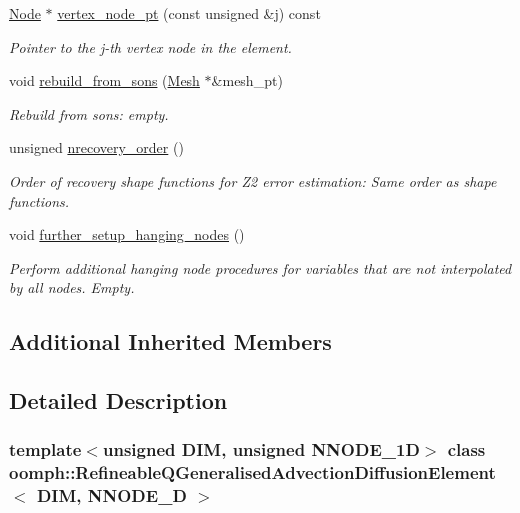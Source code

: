 \begin{DoxyCompactItemize}
\hyperlink{classoomph_1_1Node}{Node} $\ast$ \hyperlink{classoomph_1_1RefineableQGeneralisedAdvectionDiffusionElement_a24d593b020485e3786c1e4ae0dbaae6c}{vertex\+\_\+node\+\_\+pt} (const unsigned \&j) const
\begin{DoxyCompactList}\small\item\em Pointer to the j-\/th vertex node in the element. \end{DoxyCompactList}\item 
void \hyperlink{classoomph_1_1RefineableQGeneralisedAdvectionDiffusionElement_ac246ca3a3238407f40fe56bc2fd449bb}{rebuild\+\_\+from\+\_\+sons} (\hyperlink{classoomph_1_1Mesh}{Mesh} $\ast$\&mesh\+\_\+pt)
\begin{DoxyCompactList}\small\item\em Rebuild from sons\+: empty. \end{DoxyCompactList}\item 
unsigned \hyperlink{classoomph_1_1RefineableQGeneralisedAdvectionDiffusionElement_a5bc265e732c2d5a0c9e5bb699c1cdc6e}{nrecovery\+\_\+order} ()
\begin{DoxyCompactList}\small\item\em Order of recovery shape functions for Z2 error estimation\+: Same order as shape functions. \end{DoxyCompactList}\item 
void \hyperlink{classoomph_1_1RefineableQGeneralisedAdvectionDiffusionElement_aed1ecf019fccb11fb5283579dea213ca}{further\+\_\+setup\+\_\+hanging\+\_\+nodes} ()
\begin{DoxyCompactList}\small\item\em Perform additional hanging node procedures for variables that are not interpolated by all nodes. Empty. \end{DoxyCompactList}\end{DoxyCompactItemize}
\subsection*{Additional Inherited Members}


\subsection{Detailed Description}
\subsubsection*{template$<$unsigned D\+IM, unsigned N\+N\+O\+D\+E\+\_\+1D$>$\newline
class oomph\+::\+Refineable\+Q\+Generalised\+Advection\+Diffusion\+Element$<$ D\+I\+M, N\+N\+O\+D\+E\+\_\+D $>$}

